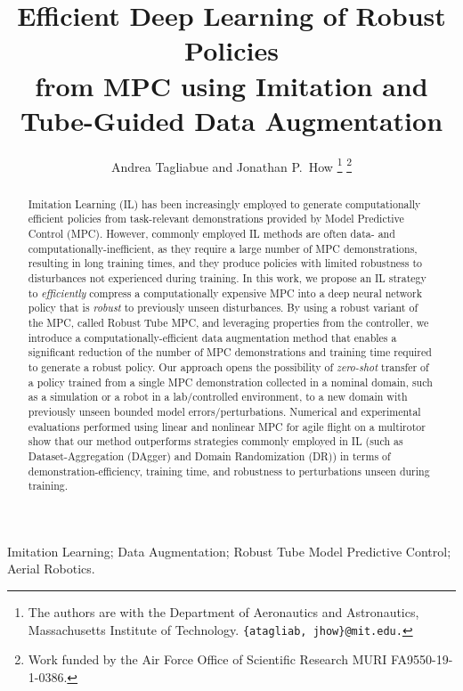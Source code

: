 \documentclass[letterpaper, 10 pt, journal, twoside]{IEEEtran}
\begin{document}
\title{Efficient Deep Learning of Robust Policies\\ 
from MPC using Imitation and\\ Tube-Guided Data Augmentation}
\author{Andrea Tagliabue and Jonathan P.\ How%
	\thanks{The authors are with the Department of Aeronautics and Astronautics, Massachusetts Institute of Technology.
	    {\texttt{\{atagliab, jhow\}@mit.edu.}}}
    \thanks{Work funded by the Air Force Office of Scientific Research MURI FA9550-19-1-0386.}
}%

\maketitle

\begin{abstract}
Imitation Learning (IL) has been increasingly employed to generate computationally efficient policies from task-relevant demonstrations provided by Model Predictive Control (MPC). However, commonly employed IL methods are often data- and computationally-inefficient, as they require a large number of MPC demonstrations, resulting in long training times, and they produce policies with limited robustness to disturbances not experienced during training.
In this work, we propose an IL strategy to \textit{efficiently} compress a computationally expensive MPC into a deep neural network policy that is \textit{robust} to previously unseen disturbances. 
By using a robust variant of the MPC, called Robust Tube MPC, and leveraging properties from the controller, we introduce a computationally-efficient data augmentation method that enables a significant reduction of the number of MPC demonstrations and training time required to generate a robust policy. %
Our approach opens the possibility of \textit{zero-shot} transfer of a policy trained from a single MPC demonstration collected in a nominal domain, such as a simulation or a robot in a lab/controlled environment, to a new domain with previously unseen bounded model errors/perturbations. 
Numerical and experimental evaluations performed using linear and nonlinear MPC for agile flight on a multirotor show that our method outperforms strategies commonly employed in IL (such as Dataset-Aggregation (DAgger) and Domain Randomization (DR)) in terms of demonstration-efficiency, training time, and robustness to perturbations unseen during training. %
\end{abstract}

\begin{IEEEkeywords}
Imitation Learning; Data Augmentation; Robust Tube Model Predictive Control; Aerial Robotics.
\end{IEEEkeywords}
\vspace{-3ex}
\end{document}
